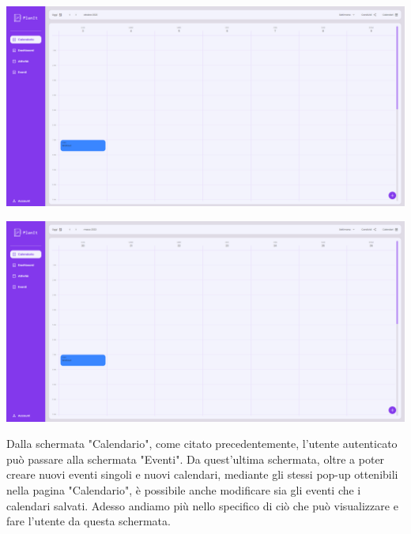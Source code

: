 \begin{center}
    \includegraphics[width=1\textwidth, height=0.3\textheight]{img/png/FrontEnd/Calendario/calendario_passato.png}
\end{center}

\begin{center}
    \includegraphics[width=1\textwidth, height=0.3\textheight]{img/png/FrontEnd/Calendario/calendario_futuro.png}
\end{center}

Dalla schermata "Calendario", come citato precedentemente, l'utente autenticato può passare alla schermata "Eventi". Da quest'ultima schermata, oltre a poter creare nuovi eventi singoli e nuovi calendari, mediante gli stessi pop-up ottenibili nella pagina "Calendario", è possibile anche modificare sia gli eventi che i calendari salvati. Adesso andiamo più nello specifico di ciò che può visualizzare e fare l'utente da questa schermata.

